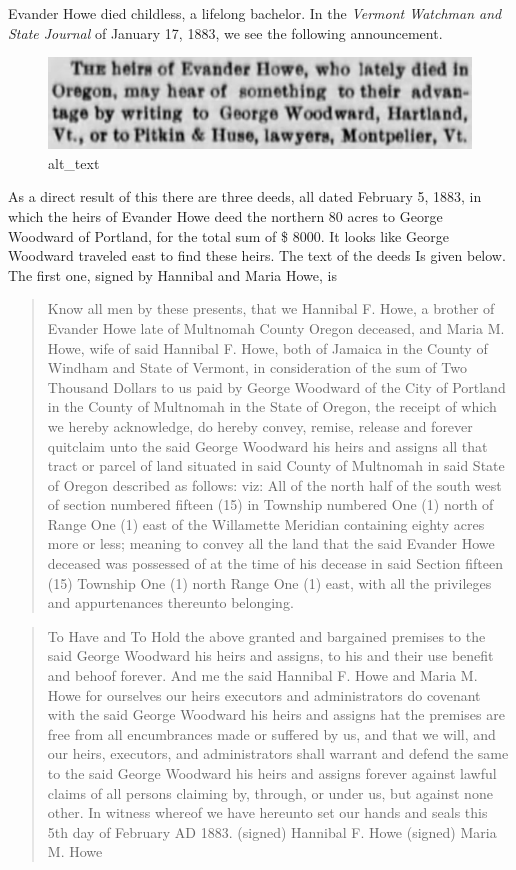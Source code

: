 \documentclass[
  12pt,
]{book}
\begin{document}
Evander Howe died childless, a lifelong bachelor. In the \emph{Vermont Watchman and State Journal} of January 17, 1883, we see the following announcement.

\begin{figure}
\centering
\includegraphics{images/0201a_images/image2.png}
\caption{alt\_text}
\end{figure}

As a direct result of this there are three deeds, all dated February 5, 1883, in which the heirs of Evander Howe deed the northern 80 acres to George Woodward of Portland, for the total sum of \$ 8000. It looks like George Woodward traveled east to find these heirs. The text of the deeds Is given below. The first one, signed by Hannibal and Maria Howe, is

\begin{quote}
Know all men by these presents, that we Hannibal F. Howe, a brother of Evander Howe late of Multnomah County Oregon deceased, and Maria M. Howe, wife of said Hannibal F. Howe, both of Jamaica in the County of Windham and State of Vermont, in consideration of the sum of Two Thousand Dollars to us paid by George Woodward of the City of Portland in the County of Multnomah in the State of Oregon, the receipt of which we hereby acknowledge, do hereby convey, remise, release and forever quitclaim unto the said George Woodward his heirs and assigns all that tract or parcel of land situated in said County of Multnomah in said State of Oregon described as follows: viz: All of the north half of the south west of section numbered fifteen (15) in Township numbered One (1) north of Range One (1) east of the Willamette Meridian containing eighty acres more or less; meaning to convey all the land that the said Evander Howe deceased was possessed of at the time of his decease in said Section fifteen (15) Township One (1) north Range One (1) east, with all the privileges and appurtenances thereunto belonging.
\end{quote}

\begin{quote}
To Have and To Hold the above granted and bargained premises to the said George Woodward his heirs and assigns, to his and their use benefit and behoof forever. And me the said Hannibal F. Howe and Maria M. Howe for ourselves our heirs executors and administrators do covenant with the said George Woodward his heirs and assigns hat the premises are free from all encumbrances made or suffered by us, and that we will, and our heirs, executors, and administrators shall warrant and defend the same to the said George Woodward his heirs and assigns forever against lawful claims of all persons claiming by, through, or under us, but against none other. In witness whereof we have hereunto set our hands and seals this 5th day of February AD 1883. (signed) Hannibal F. Howe (signed) Maria M. Howe
\end{quote}
\end{document}
